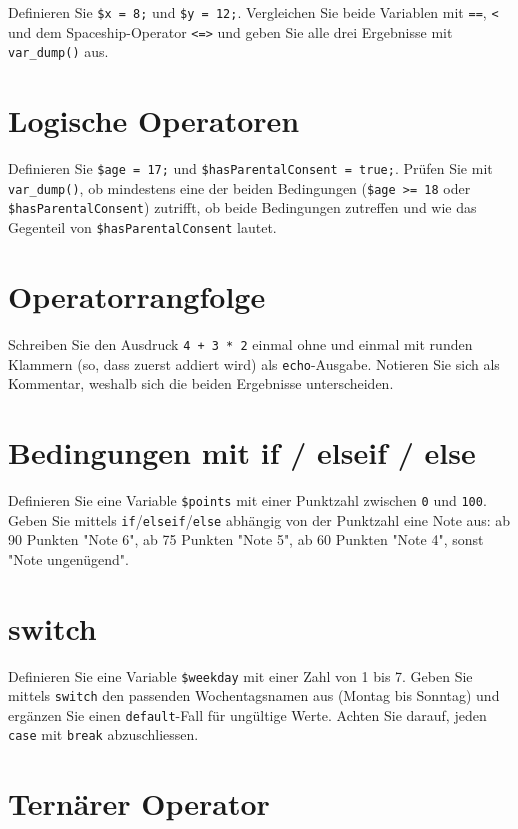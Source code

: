 \documentclass[a4paper,12pt]{article}
\begin{document}
Definieren Sie \texttt{\$x = 8;} und \texttt{\$y = 12;}. Vergleichen Sie beide Variablen mit \texttt{==}, \texttt{<} und dem Spaceship-Operator \texttt{<=>} und geben Sie alle drei Ergebnisse mit \texttt{var\_dump()} aus.

\section{Logische Operatoren}

Definieren Sie \texttt{\$age = 17;} und \texttt{\$hasParentalConsent = true;}. Prüfen Sie mit \texttt{var\_dump()}, ob mindestens eine der beiden Bedingungen (\texttt{\$age >= 18} oder \texttt{\$hasParentalConsent}) zutrifft, ob beide Bedingungen zutreffen und wie das Gegenteil von \texttt{\$hasParentalConsent} lautet.

\section{Operatorrangfolge}

Schreiben Sie den Ausdruck \texttt{4 + 3 * 2} einmal ohne und einmal mit runden Klammern (so, dass zuerst addiert wird) als \texttt{echo}-Ausgabe. Notieren Sie sich als Kommentar, weshalb sich die beiden Ergebnisse unterscheiden.

\section{Bedingungen mit if / elseif / else}

Definieren Sie eine Variable \texttt{\$points} mit einer Punktzahl zwischen \texttt{0} und \texttt{100}. Geben Sie mittels \texttt{if}/\texttt{elseif}/\texttt{else} abhängig von der Punktzahl eine Note aus: ab 90 Punkten "Note 6", ab 75 Punkten "Note 5", ab 60 Punkten "Note 4", sonst "Note ungenügend".

\section{switch}

Definieren Sie eine Variable \texttt{\$weekday} mit einer Zahl von 1 bis 7. Geben Sie mittels \texttt{switch} den passenden Wochentagsnamen aus (Montag bis Sonntag) und ergänzen Sie einen \texttt{default}-Fall für ungültige Werte. Achten Sie darauf, jeden \texttt{case} mit \texttt{break} abzuschliessen.

\section{Ternärer Operator}
\end{document}
